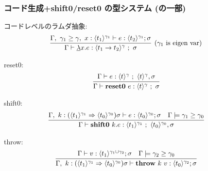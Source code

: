\begin{frame}[fragile]
  \frametitle{コード生成+shift0/reset0 の型システム (の一部)}
  コードレベルのラムダ抽象:
  \[
    \infer[(\gamma_1~\text{is eigen var})]
    {\Gamma \vdash \cfun{x}{e} : \codeT{t_1\to t_2}{\gamma} ~;~ \sigma}
    {\Gamma,~\gamma_1 \ord \gamma,~x:\codeT{t_1}{\gamma_1} \vdash e
      : \codeT{t_2}{\gamma_1}; \sigma}
  \]

  reset0:
  \[
    \infer{\Gamma \vdash \resetz{e} : \codeT{t}{\gamma} ~;~ \sigma}
    {\Gamma \vdash e : \codeT{t}{\gamma} ~;~ \codeT{t}{\gamma}, \sigma}
  \]

  shift0:
  \[
    \infer{\Gamma \vdash \shiftz{k}{e} : \codeT{t_1}{\gamma_1} ~;~ \codeT{t_0}{\gamma_0},\sigma}
    {\Gamma,~k:\contT{\codeT{t_1}{\gamma_1}}{\codeT{t_0}{\gamma_0}}{\sigma}
      \vdash e : \codeT{t_0}{\gamma_0} ; \sigma
      & \Gamma \models \gamma_1 \ord \gamma_0
    }
  \]

  throw:
  \[
  \infer
  {\Gamma,~k:\contT{\codeT{t_1}{\gamma_1}}{\codeT{t_0}{\gamma_0}}{\sigma}
    \vdash \throw{k}{v} : \codeT{t_0}{\gamma_2} ; \sigma}
  {\Gamma
    \vdash v : \codeT{t_1}{\gamma_1 \cup \gamma_2} ; \sigma
    & \Gamma \models \gamma_2 \ord \gamma_0
  }
\]

\end{frame}


